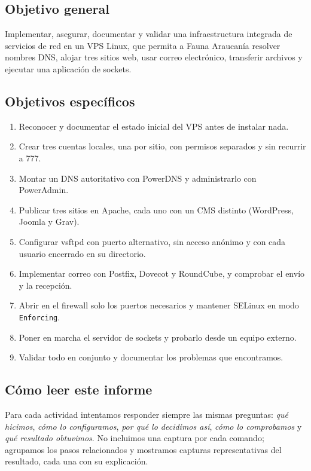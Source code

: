 \documentclass[11pt,a4paper]{article}
\begin{document}
\subsection{Objetivo general}
Implementar, asegurar, documentar y validar una infraestructura integrada de servicios de red en un VPS Linux, que permita a Fauna Araucanía resolver nombres DNS, alojar tres sitios web, usar correo electrónico, transferir archivos y ejecutar una aplicación de sockets.

\subsection{Objetivos específicos}
\begin{enumerate}\setlength\itemsep{0pt}
\item Reconocer y documentar el estado inicial del VPS antes de instalar nada.
\item Crear tres cuentas locales, una por sitio, con permisos separados y sin recurrir a 777.
\item Montar un DNS autoritativo con PowerDNS y administrarlo con PowerAdmin.
\item Publicar tres sitios en Apache, cada uno con un CMS distinto (WordPress, Joomla y Grav).
\item Configurar vsftpd con puerto alternativo, sin acceso anónimo y con cada usuario encerrado en su directorio.
\item Implementar correo con Postfix, Dovecot y RoundCube, y comprobar el envío y la recepción.
\item Abrir en el firewall solo los puertos necesarios y mantener SELinux en modo \texttt{Enforcing}.
\item Poner en marcha el servidor de sockets y probarlo desde un equipo externo.
\item Validar todo en conjunto y documentar los problemas que encontramos.
\end{enumerate}

\subsection{Cómo leer este informe}
Para cada actividad intentamos responder siempre las mismas preguntas: \emph{qué hicimos}, \emph{cómo lo configuramos}, \emph{por qué lo decidimos así}, \emph{cómo lo comprobamos} y \emph{qué resultado obtuvimos}. No incluimos una captura por cada comando; agrupamos los pasos relacionados y mostramos capturas representativas del resultado, cada una con su explicación.
\end{document}
